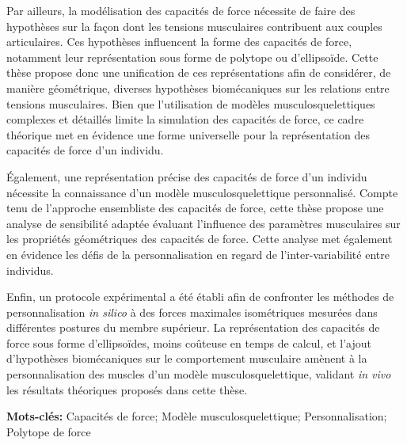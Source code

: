 Par ailleurs, la modélisation des capacités de force nécessite de faire des hypothèses sur la façon dont les tensions musculaires contribuent aux couples articulaires. Ces hypothèses influencent la forme des capacités de force, notamment leur représentation sous forme de polytope ou d'ellipsoïde. Cette thèse propose donc une unification de ces représentations afin de considérer, de manière géométrique, diverses hypothèses biomécaniques sur les relations entre tensions musculaires. Bien que l'utilisation de modèles musculosquelettiques complexes et détaillés limite la simulation des capacités de force, ce cadre théorique met en évidence une forme universelle pour la représentation des capacités de force d'un individu.

Également, une représentation précise des capacités de force d'un individu nécessite la connaissance d'un modèle musculosquelettique personnalisé. Compte tenu de l'approche ensembliste des capacités de force, cette thèse propose une analyse de sensibilité adaptée évaluant l'influence des paramètres musculaires sur les propriétés géométriques des capacités de force. Cette analyse met également en évidence les défis de la personnalisation en regard de l'inter-variabilité entre individus.

Enfin, un protocole expérimental a été établi afin de confronter les méthodes de personnalisation \emph{in silico} à des forces maximales isométriques mesurées dans différentes postures du membre supérieur. La représentation des capacités de force sous forme d'ellipsoïdes, moins coûteuse en temps de calcul, et l'ajout d'hypothèses biomécaniques sur le comportement musculaire amènent à la personnalisation des muscles d'un modèle musculosquelettique, validant \emph{in vivo} les résultats théoriques proposés dans cette thèse.

\textbf{Mots-clés:} Capacités de force; Modèle musculosquelettique; Personnalisation; Polytope de force
